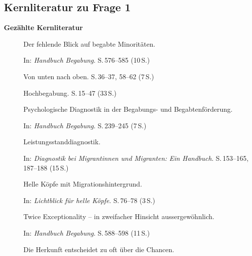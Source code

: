 
\subsection{Kernliteratur zu Frage 1}

\textbf{Gezählte Kernliteratur}

\begin{description}
  \item[\cite{stamm2021fehlenderblick}] Der fehlende Blick auf begabte Minoritäten.
    
    In: \textit{Handbuch Begabung}.
    S.\,576--585 (10\,S.)

  \item[\cite{stamm2025vonuntennachoben}] Von unten nach oben.
    S.\,36--37, 58--62 (7\,S.)

  \item[\cite{preckel2013hochbegabung}] Hochbegabung.
    S.\,15--47 (33\,S.)

  \item[\cite{gauckreimann2021psychdiagnostik}] Psychologische Diagnostik in der Begabungs- und Begabtenförderung.
    
    In: \textit{Handbuch Begabung}.
    S.\,239--245 (7\,S.)

  \item[\cite{haag2018leistungsstanddiagnostik}] Leistungsstanddiagnostik.
    
    In: \textit{Diagnostik bei Migrantinnen und Migranten: Ein Handbuch}.
    S.\,153--165, 187--188 (15\,S.)

  \item[\cite{kellerkoller2025hellekoepfe}] Helle Köpfe mit Migrationshintergrund.
    
    In: \textit{Lichtblick für helle Köpfe}.
    S.\,76--78 (3\,S.)

  \item[\cite{baumschader2021twice}] {Twice Exceptionality} -- in zweifacher Hinsicht aussergewöhnlich.
    
    In: \textit{Handbuch Begabung}.
    S.\,588--598 (11\,S.)

  \item[\cite{koop2025herkunft}] Die Herkunft entscheidet zu oft über die Chancen.
    

\end{description}
